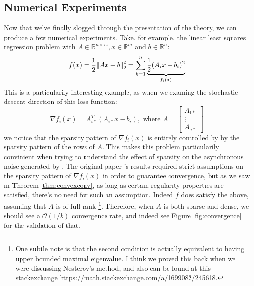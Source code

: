 \subsection{Numerical Experiments}
Now that we've finally slogged through the presentation of the theory, we can
produce a few numerical experiments. Take, for example, the linear least squares
regression problem with $A \in \mathbb{R}^{n \times m}, x \in \mathbb{R}^m$ and
$b \in \mathbb{R}^n$:
\[
  f(x) = \frac{1}{2}\norm{Ax-b}_2^2 
  = \sum_{k=1}^n 
  \underbrace{ \frac{1}{2} (A_ix - b_i)^2 }_{f_i(x)}
\]
This is a particularily interesting example, as when we examing the stochastic
descent direction of this loss function:
\[
  \nabla f_i(x) = A_{i*}^T(A_{i*}x - b_i), 
  \text{ where }
  A = 
  \begin{bmatrix}
    A_{1*} \\
    \vdots \\
    A_{n*}
  \end{bmatrix}
\]
we notice that the sparsity pattern of $\nabla f_i(x)$ is entirely controlled by
by the sparsity pattern of the rows of $A$. This makes this problem
particularily convinient when trying to understand the effect of sparsity on the
asynchronous noise generated by \hogwild. The original paper \cite{2011NRRW}'s
results required strict assumptions on the sparsity pattern of $\nabla f_i(x)$
in order to guarantee convergence, but as we saw in Theorem
\ref{thm:convexconv}, as long as certain regularity properties are satisfied,
there's no need for such an assumption. Indeed $f$ does satisfy the above,
assuming that $A$ is of full rank%
\footnote{
  One subtle note is that the second condition is actually equivalent to having
  upper bounded maximal eigenvalue. I think we proved this back when we were
  discussing Nesterov's method, and also can be found at this stackexchange
  \url{https://math.stackexchange.com/a/1699082/245618}.
}. Therefore, when $A$ is both sparse and dense, we should see
a $\mathcal{O}(1/k)$ convergence rate, and indeed see Figure
\ref{fig:convergence} for the validation of that.
